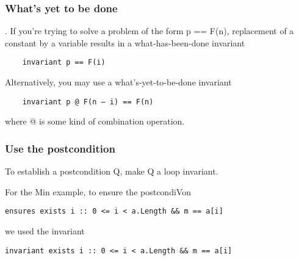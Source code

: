\subsubsection{What's yet to be done}.
If you're trying to solve a problem of the form
p == F(n), replacement of a constant by a variable
results in a what-has-been-done invariant
\begin{verbatim}
    invariant p == F(i)
\end{verbatim}
Alternatively, you may use a what's-yet-to-be-done
invariant

\begin{verbatim}
    invariant p @ F(n – i) == F(n)
\end{verbatim}
where @ is some kind of combination operation.

\subsubsection{Use the postcondition}
To establish a postcondition Q, make Q a loop
invariant.

For the Min example, to ensure the postcondiVon
\begin{verbatim}
ensures exists i :: 0 <= i < a.Length && m == a[i]
\end{verbatim}
we used the invariant
\begin{verbatim}
invariant exists i :: 0 <= i < a.Length && m == a[i]
\end{verbatim}